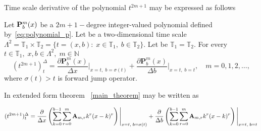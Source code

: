 Time scale derivative of the polynomial $t^{2m+1}$ may be expressed as follows
\begin{thm}
    \label{main_theorem}
    Let ${\mathbf{P}}\sp{m} \sb{b}(x)$ be a $2m+1-$degree integer-valued polynomial defined by~\eqref{eq:polynomial_p}.
    Let be a two-dimensional time scale
    $\Lambda^2 = \mathbb{T}_1 \times \mathbb{T}_2 = \{t=(x, b) \colon \; x\in\mathbb{T}_1, \; b\in\mathbb{T}_2 \}$.
    Let be $\mathbb{T}_1 = \mathbb{T}_2$.
    For every $t\in\mathbb{T}_1, \; x,b\in \Lambda^2, \; m\in\mathbb{N}$
    \[
        (t^{2m+1})^{\Delta}_{t} =
        \frac{\partial \mathbf{P}_b^m(x)}{\Delta x} \bigg |_{x = t, \; b = \sigma(t)}+
        \frac{\partial \mathbf{P}_b^m(x)}{\Delta b} \bigg |_{x = t, \; b = t}, \quad m = 0,1,2,\dots,
    \]
    where $\sigma(t) > t$ is forward jump operator.
\end{thm}

In extended form theorem ~\ref{main_theorem} may be written as

\begin{align*}
(t^{2m+1})
    ^{\Delta}_{t} =
    \frac{\partial}{\Delta x} \left( \sum_{k=0}^{b-1} \sum_{r=0}^{m} {\mathbf{A}} \sb{m,r} k^r(x-k)^r \right) \Bigg |_{x = t, \; b = \sigma(t)}
    + \frac{\partial}{\Delta b} \left( \sum_{k=0}^{b-1} \sum_{r=0}^{m} {\mathbf{A}} \sb{m,r} k^r(x-k)^r \right) \Bigg |_{x = t, \; b = t}
\end{align*}